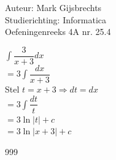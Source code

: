 \documentclass[a4paper]{article}
\newcommand{\dint}{\displaystyle\int}
\begin{document}
\noindent \large Auteur: Mark Gijsbrechts \\
\noindent \large Studierichting: Informatica\\
\noindent \large Oefeningenreeks 4A nr. 25.4\\

\medskip

\normalsize





$\dint \dfrac{3}{x+3} dx $ \\

$= 3 \dint \dfrac{dx}{x+3} $ \\

Stel $ t = x + 3 \Rightarrow dt = dx$ \\

$= 3 \dint \dfrac{dt}{t} $ \\

$= 3 \ln|t| + c $ \\

$= 3 \ln|x+3| + c $ \\


\begin{thebibliography}{999}
\end{thebibliography}
\end{document}
